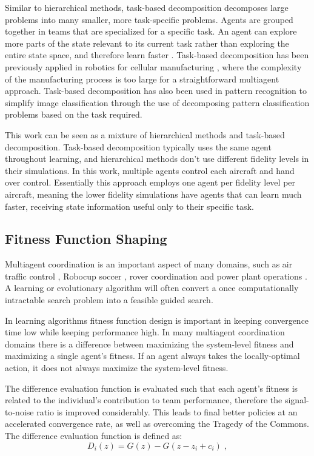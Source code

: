 \documentclass{aamas2014}
\begin{document}
Similar to hierarchical methods, task-based decomposition decomposes large problems into many smaller, more task-specific problems. Agents are grouped together in teams that are specialized for a specific task. An agent can explore more parts of the state relevant to its current task rather than exploring the entire state space, and therefore learn faster \cite{Doucette:2012:HTD:2330163.2330178, 4708962}. Task-based decomposition has been previously applied in robotics for cellular manufacturing \cite{399902}, where the complexity of the manufacturing process is too large for a straightforward multiagent approach.  Task-based decomposition has also been used in pattern recognition \cite{788664} to simplify image classification through the use of decomposing pattern classification problems based on the task required.

This work can be seen as a mixture of hierarchical methods and task-based decomposition. Task-based decomposition typically uses the same agent throughout learning, and hierarchical methods don't use different fidelity levels in their simulations. In this work, multiple agents control each aircraft and hand over control. Essentially this approach employs one agent per fidelity level per aircraft, meaning the lower fidelity simulations have agents that can learn much faster, receiving state information useful only to their specific task.

\subsection{Fitness Function Shaping}
Multiagent coordination is an important aspect of many domains, such as air traffic control \cite{tumer-agogino_jaamas12}, Robocup soccer \cite{AAMAS12-agmon}, rover coordination \cite{5509316} and power plant operations \cite{Colby:2012:SFF:2343576.2343637}. A learning or evolutionary algorithm will often convert a once computationally intractable search problem into a feasible guided search. 

In learning algorithms fitness function design is important in keeping convergence time low while keeping performance high. In many multiagent coordination domains there is a difference between maximizing the system-level fitness and maximizing a single agent's fitness. If an agent always takes the locally-optimal action, it does not always maximize the system-level fitness.

The difference evaluation function \cite{tumer-agogino_jaamas12} is evaluated such that each agent's fitness is related to the individual's contribution to team performance, therefore the signal-to-noise ratio is improved considerably. This leads to final better policies at an accelerated convergence rate, as well as overcoming the Tragedy of the Commons. The difference evaluation function is defined as:
%
\begin{equation} \label{eq:DifferenceReward}
D_i(z) = G(z) - G(z - z_i + c_i)\;,
\end{equation}
\end{document}
